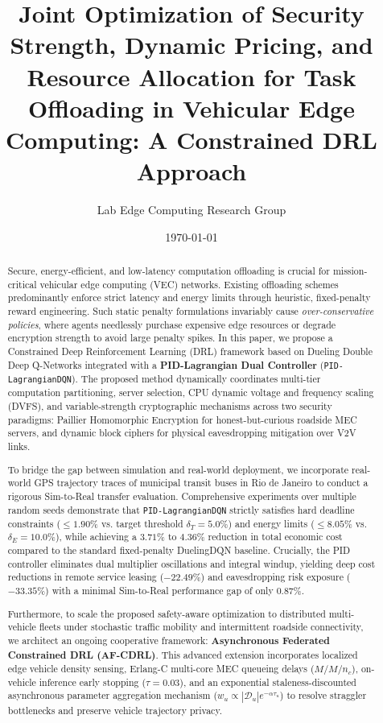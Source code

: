 \documentclass[12pt,a4paper]{article}
\title{\textbf{Joint Optimization of Security Strength, Dynamic Pricing, and Resource Allocation for Task Offloading in Vehicular Edge Computing: A Constrained DRL Approach}}
\author{Lab Edge Computing Research Group}
\date{\today}
\begin{document}
\maketitle

\begin{abstract}
Secure, energy-efficient, and low-latency computation offloading is crucial for mission-critical vehicular edge computing (VEC) networks. Existing offloading schemes predominantly enforce strict latency and energy limits through heuristic, fixed-penalty reward engineering. Such static penalty formulations invariably cause \emph{over-conservative policies}, where agents needlessly purchase expensive edge resources or degrade encryption strength to avoid large penalty spikes. In this paper, we propose a Constrained Deep Reinforcement Learning (DRL) framework based on Dueling Double Deep Q-Networks integrated with a \textbf{PID-Lagrangian Dual Controller} (\texttt{PID-LagrangianDQN}). The proposed method dynamically coordinates multi-tier computation partitioning, server selection, CPU dynamic voltage and frequency scaling (DVFS), and variable-strength cryptographic mechanisms across two security paradigms: Paillier Homomorphic Encryption for honest-but-curious roadside MEC servers, and dynamic block ciphers for physical eavesdropping mitigation over V2V links. 

To bridge the gap between simulation and real-world deployment, we incorporate real-world GPS trajectory traces of municipal transit buses in Rio de Janeiro to conduct a rigorous Sim-to-Real transfer evaluation. Comprehensive experiments over multiple random seeds demonstrate that \texttt{PID-LagrangianDQN} strictly satisfies hard deadline constraints ($\le 1.90\%$ vs. target threshold $\delta_T = 5.0\%$) and energy limits ($\le 8.05\%$ vs. $\delta_E = 10.0\%$), while achieving a $3.71\%$ to $4.36\%$ reduction in total economic cost compared to the standard fixed-penalty DuelingDQN baseline. Crucially, the PID controller eliminates dual multiplier oscillations and integral windup, yielding deep cost reductions in remote service leasing ($-22.49\%$) and eavesdropping risk exposure ($-33.35\%$) with a minimal Sim-to-Real performance gap of only $0.87\%$.

Furthermore, to scale the proposed safety-aware optimization to distributed multi-vehicle fleets under stochastic traffic mobility and intermittent roadside connectivity, we architect an ongoing cooperative framework: \textbf{Asynchronous Federated Constrained DRL (AF-CDRL)}. This advanced extension incorporates localized edge vehicle density sensing, Erlang-C multi-core MEC queueing delays ($M/M/n_c$), on-vehicle inference early stopping ($\tau = 0.03$), and an exponential staleness-discounted asynchronous parameter aggregation mechanism ($w_u \propto |\mathcal{D}_u| e^{-\alpha \tau_u}$) to resolve straggler bottlenecks and preserve vehicle trajectory privacy.
\end{abstract}
\end{document}
